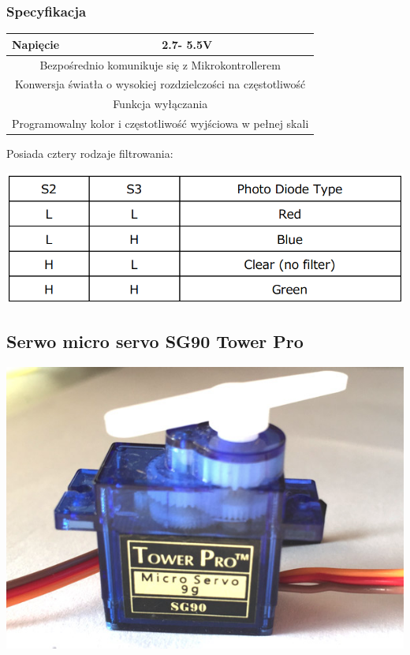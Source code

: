 \documentclass[12pt]{article}
\begin{document}
\subsubsection{Specyfikacja}
\begin{center}
\begin{tabular}{ | m{5cm} | m{3cm} | } 
\hline
Napięcie &  2.7- 5.5V\\ 
\hline
\multicolumn{2}{|c|}{Bezpośrednio komunikuje się z Mikrokontrollerem}\\ 
\hline
\multicolumn{2}{|c|}{Konwersja światła o wysokiej rozdzielczości na częstotliwość}\\ 
\hline
\multicolumn{2}{|c|}{Funkcja wyłączania}\\ 
\hline
\multicolumn{2}{|c|}{Programowalny kolor i częstotliwość wyjściowa w pełnej skali}\\ 
\hline
\end{tabular}
\end{center}
Posiada cztery rodzaje filtrowania:\\
\begin{minipage}[H]{.5\textwidth}
    \includegraphics[width=1.8\linewidth]{filtry.png}
\end{minipage}
\subsection{Serwo micro servo SG90 Tower Pro}
\begin{center}
\begin{minipage}[H]{.85\textwidth}
    \includegraphics[width=1.0\linewidth]{serwo.png}
\end{minipage}
\end{center}
\end{document}
